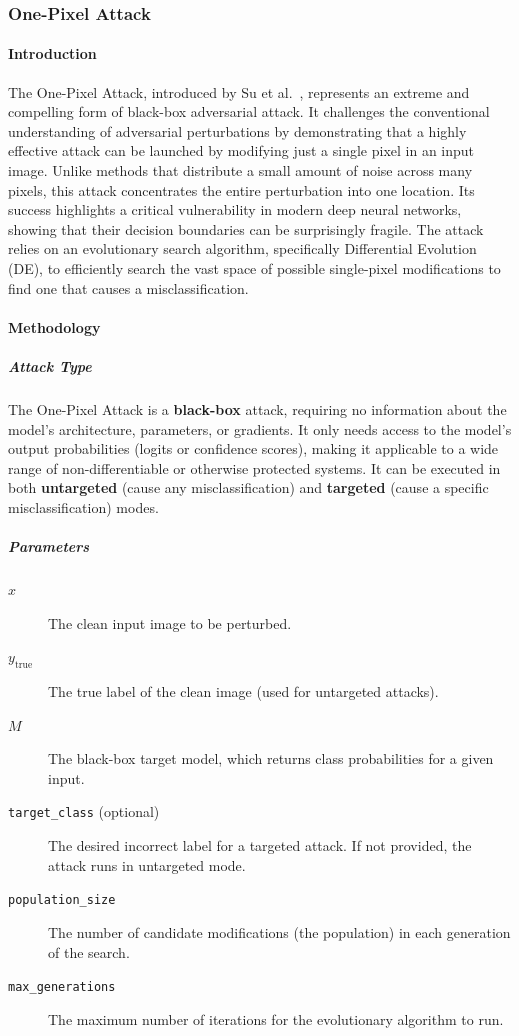 \documentclass[../main.tex]{subfiles}
\begin{document}
\subsubsection{One-Pixel Attack}

\paragraph{Introduction}
The One-Pixel Attack, introduced by Su et al.~\cite{Su_2019}, represents an extreme and compelling form of black-box adversarial attack. It challenges the conventional understanding of adversarial perturbations by demonstrating that a highly effective attack can be launched by modifying just a single pixel in an input image. Unlike methods that distribute a small amount of noise across many pixels, this attack concentrates the entire perturbation into one location. Its success highlights a critical vulnerability in modern deep neural networks, showing that their decision boundaries can be surprisingly fragile. The attack relies on an evolutionary search algorithm, specifically Differential Evolution (DE), to efficiently search the vast space of possible single-pixel modifications to find one that causes a misclassification.

\paragraph{Methodology}

\subparagraph{Attack Type} 

The One-Pixel Attack is a \textbf{black-box} attack, requiring no information about the model's architecture, parameters, or gradients. It only needs access to the model's output probabilities (logits or confidence scores), making it applicable to a wide range of non-differentiable or otherwise protected systems. It can be executed in both \textbf{untargeted} (cause any misclassification) and \textbf{targeted} (cause a specific misclassification) modes.

\subparagraph{Parameters}
\begin{description}
    \item[$x$] The clean input image to be perturbed.
    \item[$y_{\mathrm{true}}$] The true label of the clean image (used for untargeted attacks).
    \item[$M$] The black-box target model, which returns class probabilities for a given input.
    \item[\texttt{target\_class} (optional)] The desired incorrect label for a targeted attack. If not provided, the attack runs in untargeted mode.
    \item[\texttt{population\_size}] The number of candidate modifications (the population) in each generation of the search.
    \item[\texttt{max\_generations}] The maximum number of iterations for the evolutionary algorithm to run.
\end{description}
\end{document}
